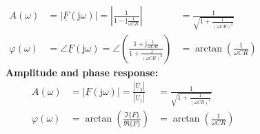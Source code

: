 \begin{frame}
\begin{columns}
{                \begin{align}
                    A(\omega)       &= |\underline{F}(\mathrm{j}\omega)| = \left|\frac{1}{1-\mathrm{j}\frac{1}{\omega CR}}\right|
                                    &= \frac{1}{\sqrt{1 + \frac{1}{(\omega CR)^2}}} \label{eq:hochpass:ampli}\\
                    \varphi(\omega) &= \angle \underline{F}(\mathrm{j}\omega) = \angle\left(\frac{1 + \mathrm{j}\frac{1}{\omega CR}}{1 + \frac{1}{(\omega CR)^2}}\right)
                                    &= \arctan\left(\frac{1}{\omega CR}\right)\label{eq:hochpass:phase}
                \end{align}
            }%
            \b{%
                \textbf{Amplitude and phase response:}
                \begin{align*} %
                    A(\omega)       &= |\underline{F}(\mathrm{j}\omega)| = \frac{|\underline{U}_2|}{|\underline{U}_1|}
                                    &= \frac{1}{\sqrt{1 + \frac{1}{(\omega CR)^2}}} \\
                    \varphi(\omega) &= \arctan\left(\frac{\Im\{\underline{F}\}}{\Re\{\underline{F}\}}\right)
                                    &= \arctan\left(\frac{1}{\omega CR}\right)\\
                \end{align*}
            }%
    \end{columns}
\end{frame}


